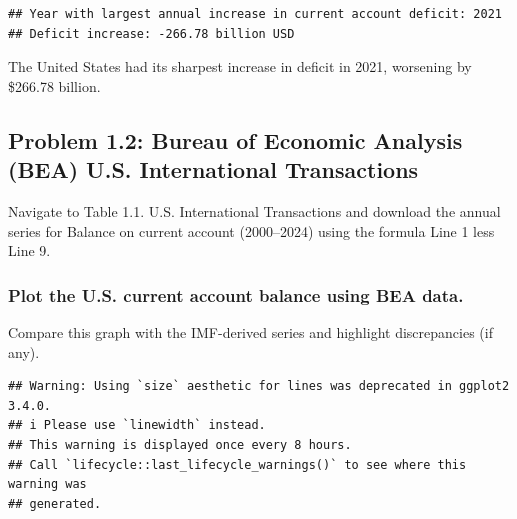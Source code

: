 \documentclass[
]{article}
\begin{document}
\begin{verbatim}
## Year with largest annual increase in current account deficit: 2021 
## Deficit increase: -266.78 billion USD
\end{verbatim}

The United States had its sharpest increase in deficit in 2021,
worsening by \$266.78 billion.

\subsection{Problem 1.2: Bureau of Economic Analysis (BEA) U.S.
International
Transactions}\label{problem-1.2-bureau-of-economic-analysis-bea-u.s.-international-transactions}

Navigate to Table 1.1. U.S. International Transactions and download the
annual series for Balance on current account (2000--2024) using the
formula Line 1 less Line 9.

\subsubsection{Plot the U.S. current account balance using BEA
data.}\label{plot-the-u.s.-current-account-balance-using-bea-data.}

Compare this graph with the IMF-derived series and highlight
discrepancies (if any).

\begin{verbatim}
## Warning: Using `size` aesthetic for lines was deprecated in ggplot2 3.4.0.
## i Please use `linewidth` instead.
## This warning is displayed once every 8 hours.
## Call `lifecycle::last_lifecycle_warnings()` to see where this warning was
## generated.
\end{verbatim}
\end{document}
